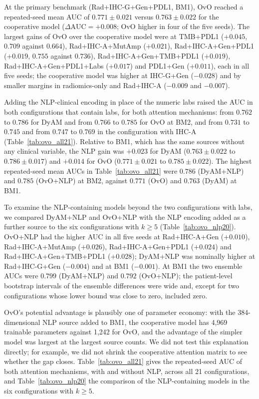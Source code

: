 At the primary benchmark (Rad+IHC-G+Gen+PDL1, BM1), OvO reached a repeated-seed mean AUC of $0.771 \pm 0.021$
versus $0.763 \pm 0.022$ for the cooperative model ($\Delta\text{AUC} = +0.008$; OvO higher in four of the five seeds).
The largest gains of OvO over the cooperative model were at TMB+PDL1 ($+0.045$, $0.709$ against $0.664$),
Rad+IHC-A+MutAmp ($+0.021$), Rad+IHC-A+Gen+PDL1 ($+0.019$, $0.755$ against $0.736$), Rad+IHC-A+Gen+TMB+PDL1 ($+0.019$),
Rad+IHC-A+Gen+PDL1+Labs ($+0.017$) and PDL1+Gen ($+0.011$), each in all five seeds; the cooperative model was
higher at IHC-G+Gen ($-0.028$) and by smaller margins in radiomics-only and Rad+IHC-A ($-0.009$ and $-0.007$).

Adding the NLP-clinical encoding in place of the numeric labs raised the AUC in both configurations that contain labs, for both
attention mechanisms: from $0.762$ to $0.786$ for DyAM and from $0.766$ to $0.785$ for OvO at BM2, and from $0.731$ to $0.745$ and from
$0.747$ to $0.769$ in the configuration with IHC-A (Table~\ref{tab:ovo_all21}).
Relative to BM1, which has the same sources without any clinical variable, the NLP gain was $+0.023$ for DyAM
($0.763 \pm 0.022$ to $0.786 \pm 0.017$) and $+0.014$ for OvO ($0.771 \pm 0.021$ to $0.785 \pm 0.022$).
The highest repeated-seed mean AUCs in Table~\ref{tab:ovo_all21} were $0.786$ (DyAM+NLP) and $0.785$ (OvO+NLP) at BM2,
against $0.771$ (OvO) and $0.763$ (DyAM) at BM1.

To examine the NLP-containing models beyond the two configurations with labs, we compared DyAM+NLP and OvO+NLP with the NLP
encoding added as a further source to the six configurations with $k \geq 5$ (Table~\ref{tab:ovo_nlp20}).
OvO+NLP had the higher AUC in all five seeds at Rad+IHC-A+Gen ($+0.010$), Rad+IHC-A+MutAmp ($+0.026$), Rad+IHC-A+Gen+PDL1 ($+0.024$) and
Rad+IHC-A+Gen+TMB+PDL1 ($+0.028$); DyAM+NLP was nominally higher at Rad+IHC-G+Gen ($-0.004$) and at BM1 ($-0.001$).
At BM1 the two ensemble AUCs were $0.799$ (DyAM+NLP) and $0.792$ (OvO+NLP); the patient-level bootstrap intervals of the ensemble differences
were wide and, except for two configurations whose lower bound was close to zero, included zero.

OvO's potential advantage is plausibly one of parameter economy: with the 384-dimensional
NLP source added to BM1, the cooperative model has 4{,}969 trainable parameters against 1{,}242
for OvO, and the advantage of the simpler model was largest at the largest source counts.
We did not test this explanation directly; for example, we did not shrink the cooperative
attention matrix to see whether the gap closes.
Table~\ref{tab:ovo_all21} gives the repeated-seed AUC of both attention mechanisms, with and without NLP, across all 21
configurations, and Table~\ref{tab:ovo_nlp20} the comparison of the NLP-containing models in the six configurations with $k \geq 5$.

